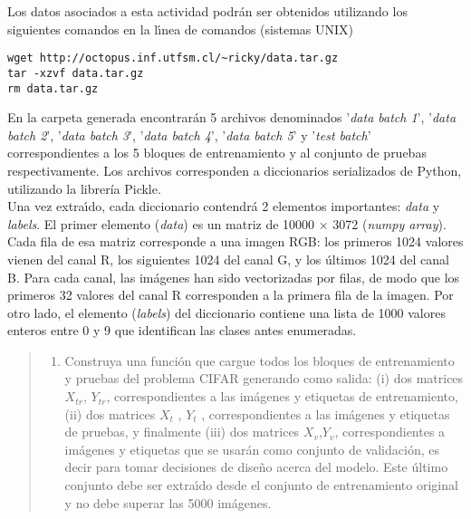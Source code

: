 \documentclass[11pt]{article}
\providecommand{\tightlist}{%
      \setlength{\itemsep}{0pt}\setlength{\parskip}{0pt}}
\begin{document}
Los datos asociados a esta actividad podrán ser obtenidos utilizando los
siguientes comandos en la lı́nea de comandos (sistemas UNIX)

\begin{verbatim}
wget http://octopus.inf.utfsm.cl/~ricky/data.tar.gz
tar -xzvf data.tar.gz
rm data.tar.gz
\end{verbatim}

En la carpeta generada encontrarán 5 archivos denominados '\emph{data
batch 1}', '\emph{data batch 2}', '\emph{data batch 3}', '\emph{data
batch 4}', '\emph{data batch 5}' y '\emph{test batch}' correspondientes
a los 5 bloques de entrenamiento y al conjunto de pruebas
respectivamente. Los archivos corresponden a diccionarios serializados
de Python, utilizando la librería Pickle.\\
Una vez extraı́do, cada diccionario contendrá 2 elementos importantes:
\emph{data} y \emph{labels}. El primer elemento (\emph{data}) es un
matriz de 10000 × 3072 (\emph{numpy array}). Cada fila de esa matriz
corresponde a una imagen RGB: los primeros 1024 valores vienen del canal
R, los siguientes 1024 del canal G, y los últimos 1024 del canal B. Para
cada canal, las imágenes han sido vectorizadas por filas, de modo que
los primeros 32 valores del canal R corresponden a la primera fila de la
imagen. Por otro lado, el elemento (\emph{labels}) del diccionario
contiene una lista de 1000 valores enteros entre 0 y 9 que identifican
las clases antes enumeradas.

\begin{quote}
\begin{enumerate}
\def\labelenumi{\alph{enumi})}
\tightlist
\item
  Construya una función que cargue todos los bloques de entrenamiento y
  pruebas del problema CIFAR generando como salida: (i) dos matrices
  \(X_{tr}\), \(Y_{tr}\), correspondientes a las imágenes y etiquetas de
  entrenamiento, (ii) dos matrices \(X_t\) , \(Y_t\) , correspondientes
  a las imágenes y etiquetas de pruebas, y finalmente (iii) dos matrices
  \(X_v\),\(Y_v\), correspondientes a imágenes y etiquetas que se usarán
  como conjunto de validación, es decir para tomar decisiones de diseño
  acerca del modelo. Este último conjunto debe ser extraı́do desde el
  conjunto de entrenamiento original y no debe superar las 5000
  imágenes.
\end{enumerate}
\end{quote}
\end{document}

